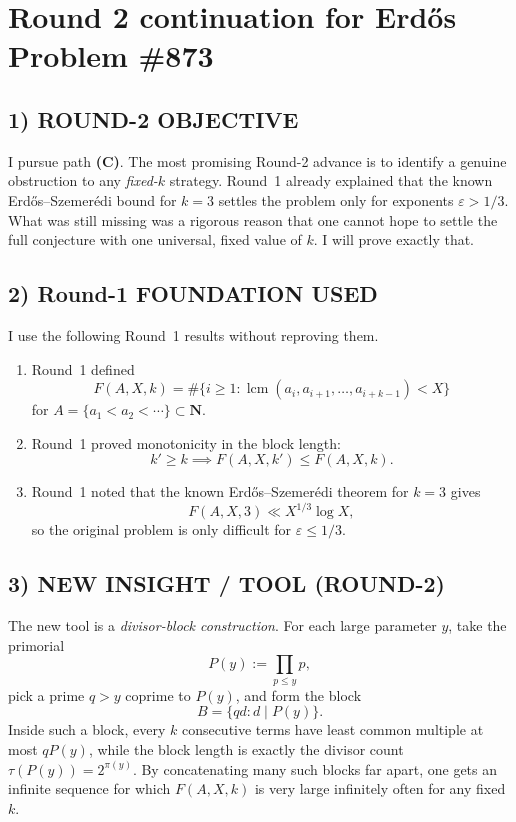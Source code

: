 \section{Round 2 continuation for Erd\H{o}s Problem \#873}

\subsection*{1) ROUND-2 OBJECTIVE}

I pursue path \textbf{(C)}. The most promising Round-2 advance is to identify a genuine obstruction to any \emph{fixed-\(k\)} strategy. Round~1 already explained that the known Erd\H{o}s--Szemer\'edi bound for \(k=3\) settles the problem only for exponents \(\varepsilon>1/3\). What was still missing was a rigorous reason that one cannot hope to settle the full conjecture with one universal, fixed value of \(k\). I will prove exactly that.

\subsection*{2) Round-1 FOUNDATION USED}

I use the following Round~1 results without reproving them.

\begin{enumerate}
\item Round~1 defined
\[
F(A,X,k)=\#\Big\{i\ge 1:\operatorname{lcm}(a_i,a_{i+1},\dots,a_{i+k-1})<X\Big\}
\]
for \(A=\{a_1<a_2<\cdots\}\subset \mathbf{N}\).
\item Round~1 proved monotonicity in the block length:
\[
k'\ge k \implies F(A,X,k')\le F(A,X,k).
\]
\item Round~1 noted that the known Erd\H{o}s--Szemer\'edi theorem for \(k=3\) gives
\[
F(A,X,3)\ll X^{1/3}\log X,
\]
so the original problem is only difficult for \(\varepsilon\le 1/3\).
\end{enumerate}

\subsection*{3) NEW INSIGHT / TOOL (ROUND-2)}

The new tool is a \emph{divisor-block construction}. For each large parameter \(y\), take the primorial
\[
P(y):=\prod_{p\le y}p,
\]
pick a prime \(q>y\) coprime to \(P(y)\), and form the block
\[
B=\{qd:d\mid P(y)\}.
\]
Inside such a block, every \(k\) consecutive terms have least common multiple at most \(qP(y)\), while the block length is exactly the divisor count \(\tau(P(y))=2^{\pi(y)}\). By concatenating many such blocks far apart, one gets an infinite sequence for which \(F(A,X,k)\) is very large infinitely often for any fixed \(k\).

